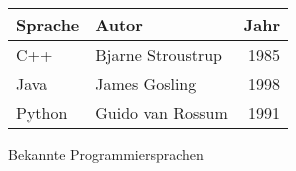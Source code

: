 \centering
\begin{tabular}{llr}
    \toprule
    Sprache & Autor             & Jahr \\
    \midrule
    C++     & Bjarne Stroustrup & 1985 \\
    Java    & James Gosling     & 1998 \\
    Python  & Guido van Rossum  & 1991 \\
    \bottomrule
\end{tabular}
\caption*{Bekannte Programmiersprachen}
